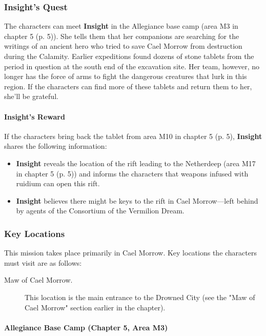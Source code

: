 \documentclass[letterpaper, 11pt, bg=full, twocolumn]{dndbook}
\begin{document}
\subsubsection{Insight's Quest}

The characters can meet \textbf{Insight} in the Allegiance base camp (area M3 in chapter 5 (p. 5)). She tells them that her companions are searching for the writings of an ancient hero who tried to save Cael Morrow from destruction during the Calamity. Earlier expeditions found dozens of stone tablets from the period in question at the south end of the excavation site. Her team, however, no longer has the force of arms to fight the dangerous creatures that lurk in this region. If the characters can find more of these tablets and return them to her, she'll be grateful.

\paragraph{Insight's Reward}

If the characters bring back the tablet from area M10 in chapter 5 (p. 5), \textbf{Insight} shares the following information:

\begin{itemize}
\item \textbf{Insight} reveals the location of the rift leading to the Netherdeep (area M17 in chapter 5 (p. 5)) and informs the characters that weapons infused with ruidium can open this rift.
\item \textbf{Insight} believes there might be keys to the rift in Cael Morrow---left behind by agents of the Consortium of the Vermilion Dream.
\end{itemize}

\subsubsection{Key Locations}

This mission takes place primarily in Cael Morrow. Key locations the characters must visit are as follows:

\begin{description}
\item[Maw of Cael Morrow.] This location is the main entrance to the Drowned City (see the "Maw of Cael Morrow" section earlier in the chapter).
\end{description}

\paragraph{Allegiance Base Camp (Chapter 5, Area M3)}
\end{document}
